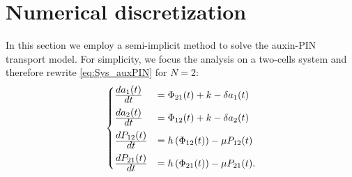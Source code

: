 \section{Numerical discretization}
In this section we employ a semi-implicit method to solve the auxin-PIN transport model. For simplicity, we focus the analysis on a two-cells system and therefore rewrite \eqref{eq:Sys_auxPIN} for $N = 2$:
\begin{equation}\begin{aligned}
\begin{cases}
  {\displaystyle d a_{1}(t)\over\displaystyle d t} & = \Phi_{21}(t) + k - \delta a_1(t) \\[6pt]
  {\displaystyle d a_{2}(t)\over\displaystyle d t} & = \Phi_{12}(t) + k - \delta a_2(t) \\[6pt]
  {\displaystyle d P_{12}(t)\over\displaystyle d t} & = h\left(\Phi_{12}(t)\right) - \mu P_{12}(t) \\[6pt]
  {\displaystyle d P_{21}(t)\over\displaystyle d t} & = h\left(\Phi_{21}(t)\right) - \mu P_{21}(t).
\end{cases}
\end{aligned} \end{equation}

